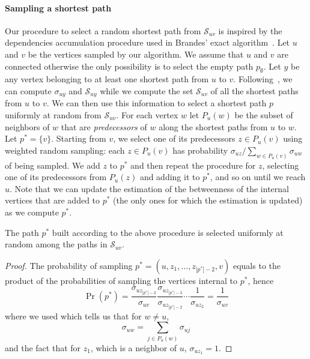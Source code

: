 \paragraph{Sampling a shortest path}
Our procedure to select a random shortest path from $\mathcal{S}_{uv}$ is
inspired by the dependencies accumulation procedure used in Brandes' exact
algorithm~\citep{Brandes01}. 
Let $u$ and $v$ be the vertices sampled by our algorithm. We assume that $u$ and
$v$ are connected otherwise the only possibility is to select the empty path
$p_\emptyset$. Let $y$ be any vertex belonging to at least one shortest path
from $u$ to $v$. Following~\citet{Brandes01}, we can compute $\sigma_{uy}$ and
$\mathcal{S}_{uy}$ while we compute the set $\mathcal{S}_{uv}$ of all the
shortest paths from $u$ to $v$. We can then use this information to select a
shortest path $p$ uniformly at random from $\mathcal{S}_{uv}$. For each vertex
$w$ let $P_u(w)$ be the subset of neighbors of $w$ that are \emph{predecessors}
of $w$ along the shortest paths from $u$ to $w$. Let $p^*=\{v\}$. Starting from
$v$, we select one of its predecessors $z\in P_u(v)$ using weighted random
sampling: each $z\in P_u(v)$ has probability $\sigma_{uz}/\sum_{w\in
P_u(v)}\sigma_{uw}$ of being sampled. We add $z$ to $p^*$ and  then repeat the
procedure for $z$, selecting one of its predecessors from $P_u(z)$ and adding it
to $p^*$, and so on until we reach $u$. Note that we can update the estimation
of the betweenness of the internal vertices that are added to $p^*$ (the only
ones for which the estimation is updated) as we compute $p^*$.

\begin{lemma}\label{lem:samplpath}
  The path $p^*$ built according to the above procedure is selected uniformly at
  random among the paths in $\mathcal{S}_{uv}$.
\end{lemma}

\begin{proof}
  The probability of sampling $p^*=(u,z_1,\dotsc,z_{|p^*|-2},v)$ equals to the
  product of the probabilities of sampling the vertices internal to $p^*$, hence
  \[
  \Pr(p^*)=\frac{\sigma_{uz_{|p^*|-2}}}{\sigma_{uv}}\frac{\sigma_{uz_{|p^*|-3}}}{\sigma_{uz_{|p^*|-2}}}\dotsb
  \frac{1}{\sigma_{uz_2}}=\frac{1}{\sigma_{uv}}
  \]
  where we used \citep[Lemma3]{Brandes01} which tells us that for $w\neq u$,
  \[
  \sigma_{uw}=\sum_{j\in P_u(w)}\sigma_{uj}
  \]
  and the fact that for $z_1$, which is a neighbor of $u$, $\sigma_{uz_1}=1$.
\end{proof}

